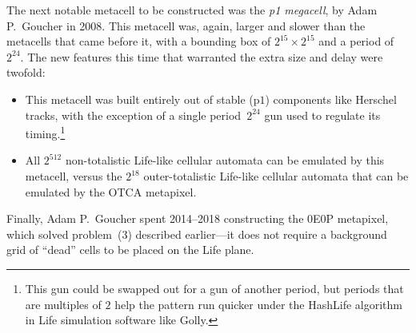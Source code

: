 The next notable metacell to be constructed was the \emph{p1 megacell}, by Adam P.~Goucher in 2008. This metacell was, again, larger and slower than the metacells that came before it, with a bounding box of $2^{15} \times 2^{15}$ and a period of $2^{24}$. The new features this time that warranted the extra size and delay were twofold:\smallskip

\begin{itemize}
	\item This metacell was built entirely out of stable (p$1$) components like Herschel tracks, with the exception of a single period~$2^{24}$ gun used to regulate its timing.\footnote{This gun could be swapped out for a gun of another period, but periods that are multiples of $2$ help the pattern run quicker under the HashLife algorithm in Life simulation software like Golly.}\smallskip
	
	\item All $2^{512}$ non-totalistic Life-like cellular automata can be emulated by this metacell, versus the $2^{18}$ outer-totalistic Life-like cellular automata that can be emulated by the OTCA metapixel.\smallskip
\end{itemize}


Finally, Adam P.~Goucher spent 2014--2018 constructing the 0E0P metapixel, which solved problem~(3) described earlier---it does not require a background grid of ``dead'' cells to be placed on the Life plane.




